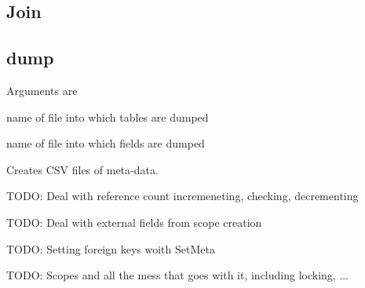 \subsection{Join}
\label{join}
\TBC
\subsection{dump}
\label{dump}

Arguments are
\be
\item name of file into which tables are dumped
\item name of file into which fields are dumped
\ee

Creates CSV files of meta-data.

TODO: Deal with reference count incremeneting, checking, decrementing

TODO: Deal with external fields from scope creation

TODO: Setting foreign keys woith SetMeta

TODO: Scopes and all the mess that goes with it, including locking, ...

